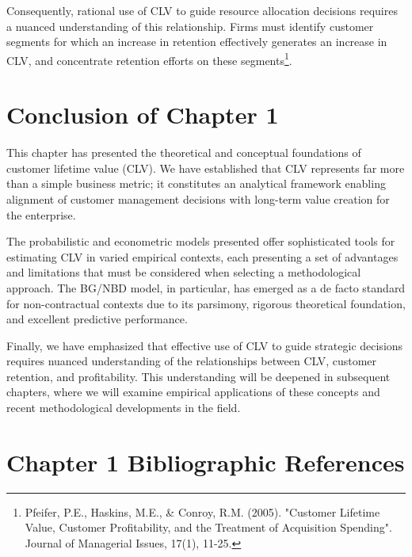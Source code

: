 \documentclass[12pt,a4paper,oneside]{report}
\begin{document}
Consequently, rational use of CLV to guide resource allocation decisions requires a nuanced understanding of this relationship. Firms must identify customer segments for which an increase in retention effectively generates an increase in CLV, and concentrate retention efforts on these segments\footnote{Pfeifer, P.E., Haskins, M.E., \& Conroy, R.M. (2005). "Customer Lifetime Value, Customer Profitability, and the Treatment of Acquisition Spending". Journal of Managerial Issues, 17(1), 11-25.}.


\section{Conclusion of Chapter 1}

This chapter has presented the theoretical and conceptual foundations of customer lifetime value (CLV). We have established that CLV represents far more than a simple business metric; it constitutes an analytical framework enabling alignment of customer management decisions with long-term value creation for the enterprise.

The probabilistic and econometric models presented offer sophisticated tools for estimating CLV in varied empirical contexts, each presenting a set of advantages and limitations that must be considered when selecting a methodological approach. The BG/NBD model, in particular, has emerged as a de facto standard for non-contractual contexts due to its parsimony, rigorous theoretical foundation, and excellent predictive performance.

Finally, we have emphasized that effective use of CLV to guide strategic decisions requires nuanced understanding of the relationships between CLV, customer retention, and profitability. This understanding will be deepened in subsequent chapters, where we will examine empirical applications of these concepts and recent methodological developments in the field.


\newpage
\section*{Chapter 1 Bibliographic References}
\end{document}

